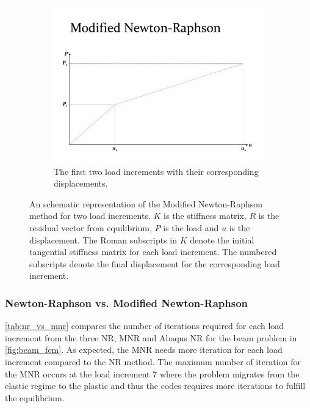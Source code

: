 \documentclass{article}
\begin{document}
\begin{figure}[ht]
        \begin{subfigure}{0.64\textwidth}
            \includegraphics[width=1\linewidth]{figures/mnr3.pdf} 
            \caption{The first two load increments with their corresponding displacements.}
            \label{fig:mnr3}
        \end{subfigure}
    \caption{An schematic representation of the Modified Newton-Raphson method for two load increments. $K$ is the stiffness matrix, $R$ is the residual vector from equilibrium, $P$ is the load and $u$ is the displacement. The Roman subscripts in $K$ denote the initial tangential stiffness matrix for each load increment. The numbered subscripts denote the final displacement for the corresponding load increment.}
    \label{fig:mnr_procedure}
\end{figure}

\subsubsection{Newton-Raphson vs. Modified Newton-Raphson}
\cref{tab:nr_vs_mnr} compares the number of iterations required for each load increment from the three NR, MNR and Abaqus NR for the beam problem in \cref{fig:beam_fem}. As expected, the MNR needs more iteration for each load increment compared to the NR method. The maximum number of iteration for the MNR occurs at the load increment 7 where the problem migrates from the elastic regime to the plastic and thus the codes requires more iterations to fulfill the equilibrium.\\
\end{document}
